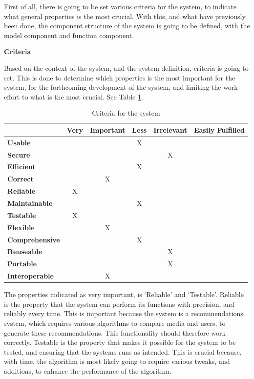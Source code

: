 First of all, there is going to be set various criteria for the system, to indicate what general properties is the most crucial. With this, and what have previously been done, the component structure of the system is going to be defined, with the model component and function component. 

\textbf{Criteria}

Based on the context of the system, and the system definition, criteria is going to set. This is done to determine which properties is the most important for the system, for the forthcoming development of the system, and limiting the work effort to what is the most crucial. See Table \ref{Criteria}.

\begin{table}[htb]
\centering
\begin{tabular}{|l|c|c|c|c|c|} \hline
	  & \textbf{Very} & \textbf{Important} & \textbf{Less} & \textbf{Irrelevant} & \textbf{Easily Fulfilled} \\ \hline
	\textbf{Usable} &  &  & X &  & \\ \hline
	\textbf{Secure} &  &  &  & X &  \\ \hline
	\textbf{Efficient} &  &  & X &  &  \\ \hline
	\textbf{Correct} &  & X &  &  &  \\ \hline
	\textbf{Reliable} & X &  &  &  &  \\ \hline
	\textbf{Maintainable} &  &  & X &  &  \\ \hline
	\textbf{Testable} & X &  &  &  &  \\ \hline
	\textbf{Flexible} &  & X &  &  &  \\ \hline
	\textbf{Comprehensive} &  &  & X &  &  \\ \hline
	\textbf{Reuseable} &  &  &  & X &  \\ \hline
	\textbf{Portable} &  &  &  & X &  \\ \hline
	\textbf{Interoperable} &  & X &  &  &  \\ \hline
\end{tabular}
\caption{Criteria for the system}
\label{Criteria}
\end{table}

The properties indicated as very important, is ‘Reliable’ and ‘Testable’. Reliable is the property that the system can perform its functions with precision, and reliably every time. This is important because the system is a recommendations system, which requires various algorithms to compare media and users, to generate these recommendations. This functionality should therefore work correctly. Testable is the property that makes it possible for the system to be tested, and ensuring that the systems runs as intended. This is crucial because, with time, the algorithm is most likely going to require various tweaks, and additions, to enhance the performance of the algorithm.

